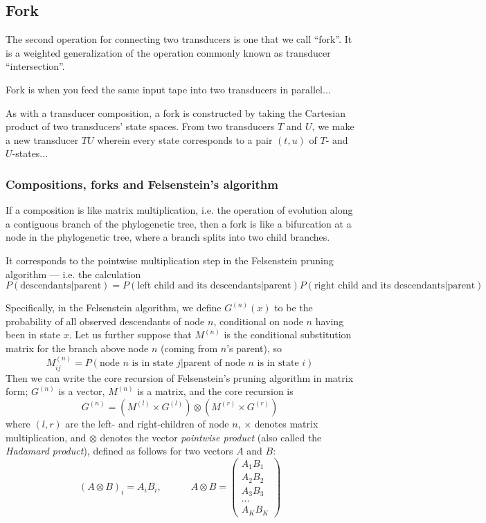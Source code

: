 \documentclass{article}
\newcommand{\seclabel}[1]{\label{sec.#1}}
\newcommand\fork{\otimes}
\begin{document}
\subsection{Fork}

The second operation for connecting two transducers
 is one that we call ``fork''.
It is a weighted generalization of the operation commonly known as transducer ``intersection''.

Fork is when you feed the same input tape into two transducers in parallel...

As with a transducer composition,
a fork is constructed by taking the Cartesian product of two transducers' state spaces.
From two transducers $T$ and $U$,
we make a new transducer $TU$
wherein every state corresponds to a pair $(t,u)$ of $T$- and $U$-states...

\subsubsection{Compositions, forks and Felsenstein's algorithm}
\seclabel{Felsenstein}

If a composition is like matrix multiplication,
i.e. the operation of evolution along a contiguous branch of the phylogenetic tree,
then a fork is like a bifurcation at a node in the phylogenetic tree,
where a branch splits into two child branches.

It corresponds to the pointwise multiplication step in the Felsenstein pruning algorithm ---
i.e. the calculation
\[
P(\mbox{descendants}|\mbox{parent}) =
P(\mbox{left child and its descendants}|\mbox{parent})
P(\mbox{right child and its descendants}|\mbox{parent})
\]

Specifically, in the Felsenstein algorithm,
we define $G^{(n)}(x)$ to be the probability of all observed descendants of node $n$,
conditional on node $n$ having been in state $x$.
Let us further suppose that $M^{(n)}$ is the conditional substitution matrix
for the branch above node $n$ (coming from $n$'s parent), so
\[
M^{(n)}_{ij}=P(\mbox{node $n$ is in state $j$}|\mbox{parent of node $n$ is in state $i$})
\]
Then we can write the core recursion of Felsenstein's pruning algorithm in matrix form;
$G^{(n)}$ is a vector, $M^{(n)}$ is a matrix, and the core recursion is
\[
G^{(n)} = \left( M^{(l)} \times G^{(l)} \right) \fork \left( M^{(r)} \times G^{(r)} \right)
\]
where $(l,r)$ are the left- and right-children of node $n$,
$\times$ denotes matrix multiplication,
and $\fork$ denotes the vector {\em pointwise product} (also called the {\em Hadamard product}),
defined as follows for two vectors $A$ and $B$:
\[
(A \fork B)_i = A_i B_i,
\quad \quad \quad
A \fork B = \left( \begin{array}{c}
A_1 B_1 \\ A_2 B_2 \\ A_3 B_3 \\ \ldots \\ A_K B_K
\end{array} \right)
\]
\end{document}
